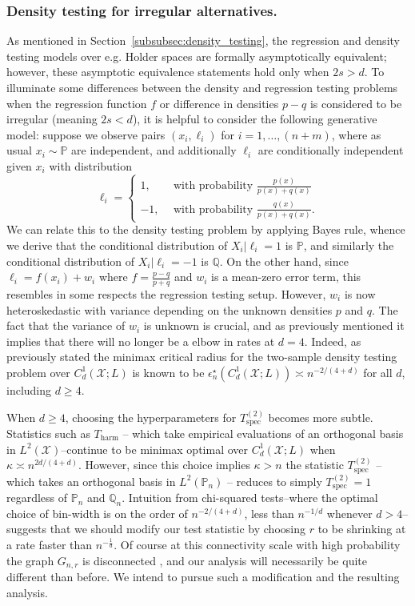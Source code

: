 \documentclass{article}
\newcommand{\1}{\mathbf{1}}
\newcommand{\Pbb}{\mathbb{P}}
\newcommand{\Qbb}{\mathbb{Q}}
\theoremstyle{alden}
\theoremstyle{aldenthm}
\theoremstyle{definition}
\theoremstyle{remark}
\begin{document}
\subsubsection{Density testing for irregular alternatives.}
As mentioned in Section~\ref{subsubsec:density_testing}, the regression and density testing models over e.g. Holder spaces are formally asymptotically equivalent; however, these asymptotic equivalence statements hold only when $2s > d$. To illuminate some differences between the density and regression testing problems when the regression function $f$ or difference in densities $p - q$ is considered to be irregular (meaning $2s < d$), it is helpful to consider the following generative model: suppose we observe pairs $(x_i,\ell_i)$ for $i = 1,\ldots, (n + m)$, where as usual $x_i \sim \Pbb$ are independent, and additionally $\ell_i$ are conditionally independent given $x_i$ with distribution
\begin{equation*}
\ell_i = 
\begin{cases*}
1, & ~~  \textrm{with probability $\frac{p(x)}{p(x) + q(x)}$} \\
-1, & ~~ \textrm{with probability $\frac{q(x)}{p(x) + q(x)}$.} 
\end{cases*}
\end{equation*}
We can relate this to the density testing problem by applying Bayes rule, whence we derive that the conditional distribution of $X_i|\ell_i = 1$ is $\mathbb{P}$, and similarly the conditional distribution of $X_i|\ell_i = -1$ is $\mathbb{Q}$. On the other hand, since $\ell_i = f(x_i) + w_i$ where $f = \frac{p - q}{p + q}$ and $w_i$ is a mean-zero error term, this resembles in some respects the regression testing setup. However, $w_i$ is now heteroskedastic with variance depending on the unknown densities $p$ and $q$. The fact that the variance of $w_i$ is unknown is crucial, and as previously mentioned it implies that there will no longer be a elbow in rates at $d = 4$. Indeed, as previously stated the minimax critical radius for the two-sample density testing problem over $C_d^1(\mathcal{X};L)$ is known to be $\epsilon_n^{\star}(C_d^1(\mathcal{X};L)) \asymp n^{-2/(4 + d)}$ for all $d$, including $d \geq 4$. 

When $d \geq 4$, choosing the hyperparameters for $T_{\mathrm{spec}}^{(2)}$ becomes more subtle. Statistics such as $T_{\mathrm{harm}}$ -- which take empirical evaluations of an orthogonal basis in $L^2(\mathcal{X})$--continue to be minimax optimal over $C_d^{1}(\mathcal{X};L)$ when $\kappa \asymp n^{2d/(4+d)}$. However, since this choice implies $\kappa > n$ the statistic $T_{\mathrm{spec}}^{(2)}$ -- which takes an orthogonal basis in $L^2(\mathbb{P}_n)$ -- reduces to simply $T_{\mathrm{spec}}^{(2)} = 1$ regardless of $\Pbb_n$ and $\Qbb_n$. Intuition from chi-squared tests--where the optimal choice of bin-width is on the order of $n^{-2/(4+d)}$, less than $n^{-1/d}$ whenever $d > 4$--suggests that we should modify our test statistic by choosing $r$ to be shrinking at a rate faster than $n^{-\frac{1}{d}}$. Of course at this connectivity scale with high probability the graph $G_{n,r}$ is disconnected \cite{penrose99}, and our analysis will necessarily be quite different than before. We intend to pursue such a modification and the resulting analysis.
\end{document}
